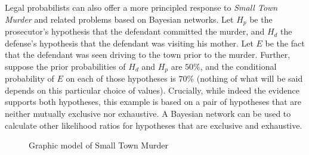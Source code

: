 \documentclass{article}
\begin{document}

Legal probabilists can also offer a more principled response to \emph{Small Town Murder} and related problems based on Bayesian networks.
Let $H_p$ be the prosecutor's hypothesis that the defendant committed the murder, and $H_d$ the defense's hypothesis  that the defendant was visiting his mother. Let $E$ be the fact that the defendant was seen driving to the town prior to the murder. Further, suppose the prior probabilities of $H_d$ and $H_p$ are $50\%$, and the conditional probability of $E$ on each of those hypotheses is $70\%$ (nothing of what will be said depends on this particular choice of values). Crucially, while indeed the evidence supports both hypotheses, this example is based on a pair of hypotheses that are neither mutually exclusive nor exhaustive. A Bayesian network can be used to calculate other likelihood ratios for hypotheses that are exclusive and exhaustive. 

%
\begin{figure}[!h]
	\begin{floatrow}
		{\caption{\footnotesize Graphic model of Small Town Murder}\label{fig:bayes_test4}}
	\end{floatrow}
\end{figure}
%
\end{document}
